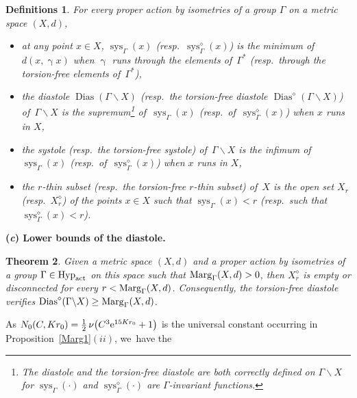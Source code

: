 \documentclass[10pt,a4paper]{amsart}
\numberwithin{equation}{section}
\newtheorem{theor}{Theorem}[section]
\newtheorem{defis}[theor]{Definitions}
\newcommand{\sys}{\operatorname{sys}}
\newcommand{\dias}{\operatorname{Dias}}
\newcommand{\g}{\operatorname{\gamma}}
\begin{document}
\begin{defis}%
For every proper action by isometries of a group $\Gamma$ on a metric space $(X,d)$,

\begin{itemize}\itemsep=0pt
\item at any point $x \in X$, $\sys_\Gamma (x)$ (resp.\ $\sys^{\diamond}_\Gamma (x)$) is the minimum of~$d(x, \g x)$ when $\g$ runs through the elements of~$\Gamma^*$ (resp.\ through the torsion-free elements of~$\Gamma^*$),

\item the diastole $\dias (\Gamma \backslash X)$ (resp.\ the torsion-free diastole $\dias^{\diamond} (\Gamma \backslash X)$) of~$\Gamma \backslash X$ is the supremum\footnote{The diastole and the torsion-free diastole are both correctly defined on $\Gamma \backslash X$ for $\sys_\Gamma (\cdot)$ and
$\sys^{\diamond}_\Gamma (\cdot)$ are $\Gamma$-invariant functions.} of~$\sys_\Gamma (x)$ (resp.\ of~$\sys^{\diamond}_\Gamma (x)$)
when $x$ runs in $X$,

\item the systole (resp.\ the torsion-free systole) of~$\Gamma \backslash X$ is the infimum of~$\sys_\Gamma (x)$ (resp.\ of~$\sys^{\diamond}_\Gamma (x)$)
when $x$ runs in $X$,

\item the $ r$-thin subset (resp.\ the torsion-free $ r$-thin subset) of~$X$ is the open set $ X_r$ (resp.\ $ X^{\diamond}_r $) of the points $x \in
X$ such that
$\sys_\Gamma (x) < r$ (resp.\ such that $\sys^{\diamond}_\Gamma (x) < r$).
\end{itemize}
\end{defis}

\medskip\noindent
{\bf (\emph{c}) Lower bounds of the diastole.}

\begin{theor}\label{transyst0}
Given a metric space $(X,d)$ and a proper action by isometries of a group $\Gamma \in \text{\rm Hyp}_{\rm act}$ on this space
such that ${\rm Marg}_\Gamma (X,d) > 0$, then $X^{\diamond}_{r}$ is empty or disconnected for every $r < {\rm Marg}_\Gamma (X,d)$.
Consequently, the torsion-free diastole verifies $\dias^{\diamond} (\Gamma \backslash X) \ge {\rm Marg}_\Gamma (X,d)$.
\end{theor}

As $N_0 (C, Kr_0)= \frac{1}{2} \,\nu \big(C^3 {\rm e}^{15 K r_0} + 1\big)$ is the universal constant occurring in Proposition~\ref{Marg1}$(ii)$, we~have the
\end{document}
